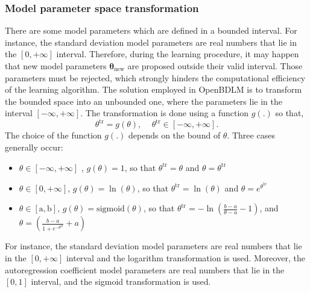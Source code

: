 \subsubsection{Model parameter space transformation}
\label{SS:THSpaceTransformation}

There are some model parameters which are defined in a bounded interval.
For instance, the standard deviation model parameters are real numbers that lie in the $[0, +\infty]$ interval.
Therefore, during the learning procedure, it may happen that new model parameters $\bm\theta_{\text{new}}$ are proposed outside their valid interval.
Those parameters must be rejected, which strongly hinders the computational efficiency of the learning algorithm.
The solution employed in OpenBDLM is to transform the bounded space into an unbounded one, where the parameters lie in the interval $[ -\infty, +\infty ]$. The transformation is done using a function $g(.)$ so that, 
\begin{equation}
\theta^{\text{tr}} = g(\theta) \text{, }\quad \theta^{\text{tr}} \in [-\infty, +\infty ] \text{.}
\end{equation}
The choice of the function $g(.)$ depends on the bound of $\theta$. 
Three cases generally occur:
\begin{itemize}
\item $ \theta \in [-\infty, +\infty ]$ , $g(\theta) = 1$, so that $\theta^{\text{tr}} = \theta$ and $\theta = \theta^{\text{tr}} $
\item $ \theta \in [0, +\infty ]$, $g(\theta) = \ln(\theta)$, so that $\theta^{\text{tr}} = \ln(\theta) $ and $\theta = e^{\theta^{\text{tr}}} $
\item $ \theta \in [\text{a}, \text{b}]$, $g(\theta) = \text{sigmoid}(\theta)$, so that $\theta^{\text{tr}} = -\ln \left( \frac{b-a}{\theta-a} - 1\right) $, and $\theta = \left( \frac{b-a}{1+e^{-\theta^{\text{tr}}}} + a \right)$
\end{itemize}
For instance, the standard deviation model parameters are real numbers that lie in the $[0, +\infty]$ interval and the logarithm transformation is used.
Moreover, the autoregression coefficient model parameters are real numbers that lie in the $[0, 1]$ interval, and the sigmoid transformation is used.

